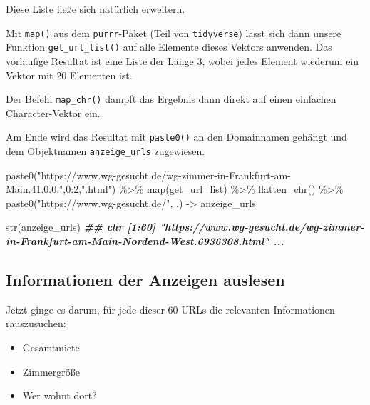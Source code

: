 \documentclass[
  ngerman,
]{article}
\newenvironment{Shaded}{\begin{snugshade}}{\end{snugshade}}
\newcommand{\DecValTok}[1]{\textcolor[rgb]{0.00,0.00,0.81}{#1}}
\newcommand{\DocumentationTok}[1]{\textcolor[rgb]{0.56,0.35,0.01}{\textbf{\textit{#1}}}}
\newcommand{\FunctionTok}[1]{\textcolor[rgb]{0.00,0.00,0.00}{#1}}
\newcommand{\NormalTok}[1]{#1}
\newcommand{\OtherTok}[1]{\textcolor[rgb]{0.56,0.35,0.01}{#1}}
\newcommand{\SpecialCharTok}[1]{\textcolor[rgb]{0.00,0.00,0.00}{#1}}
\newcommand{\StringTok}[1]{\textcolor[rgb]{0.31,0.60,0.02}{#1}}
\providecommand{\tightlist}{%
  \setlength{\itemsep}{0pt}\setlength{\parskip}{0pt}}
\begin{document}
Diese Liste ließe sich natürlich erweitern.

Mit \texttt{map()} aus dem \texttt{purrr}-Paket (Teil von \texttt{tidyverse}) lässt sich dann unsere Funktion \texttt{get\_url\_list()} auf alle Elemente dieses Vektors anwenden. Das vorläufige Resultat ist eine Liste der Länge 3, wobei jedes Element wiederum ein Vektor mit 20 Elementen ist.

Der Befehl \texttt{map\_chr()} dampft das Ergebnis dann direkt auf einen einfachen Character-Vektor ein.

Am Ende wird das Resultat mit \texttt{paste0()} an den Domainnamen gehängt und dem Objektnamen \texttt{anzeige\_urls} zugewiesen.

\begin{Shaded}
\begin{Highlighting}[]

\FunctionTok{paste0}\NormalTok{(}\StringTok{"https://www.wg{-}gesucht.de/wg{-}zimmer{-}in{-}Frankfurt{-}am{-}Main.41.0.0."}\NormalTok{,}\DecValTok{0}\SpecialCharTok{:}\DecValTok{2}\NormalTok{,}\StringTok{".html"}\NormalTok{) }\SpecialCharTok{\%\textgreater{}\%}
  \FunctionTok{map}\NormalTok{(get\_url\_list) }\SpecialCharTok{\%\textgreater{}\%}
  \FunctionTok{flatten\_chr}\NormalTok{() }\SpecialCharTok{\%\textgreater{}\%}
  \FunctionTok{paste0}\NormalTok{(}\StringTok{"https://www.wg{-}gesucht.de/"}\NormalTok{, .) }\OtherTok{{-}\textgreater{}}\NormalTok{ anzeige\_urls}

\FunctionTok{str}\NormalTok{(anzeige\_urls)}
\DocumentationTok{\#\#  chr [1:60] "https://www.wg{-}gesucht.de/wg{-}zimmer{-}in{-}Frankfurt{-}am{-}Main{-}Nordend{-}West.6936308.html" ...}
\end{Highlighting}
\end{Shaded}

\hypertarget{informationen-der-anzeigen-auslesen}{%
\subsection{Informationen der Anzeigen auslesen}\label{informationen-der-anzeigen-auslesen}}

Jetzt ginge es darum, für jede dieser 60 URLs die relevanten Informationen rauszusuchen:

\begin{itemize}
\tightlist
\item
  Gesamtmiete
\item
  Zimmergröße
\item
  Wer wohnt dort?
\end{itemize}
\end{document}
